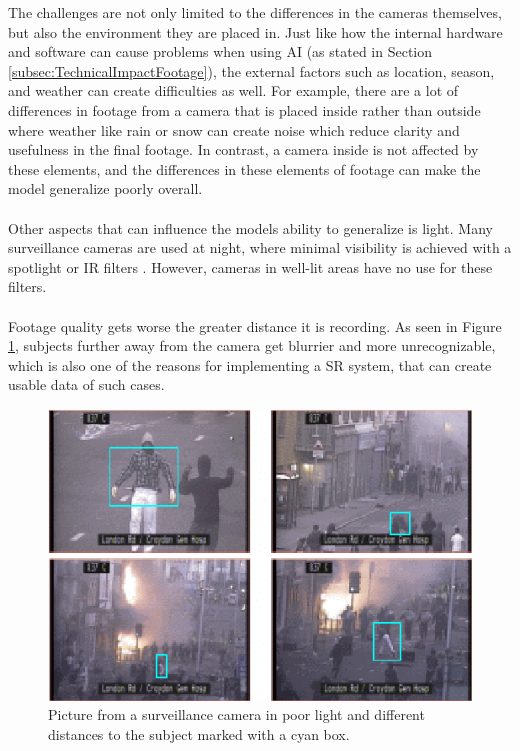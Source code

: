 The challenges are not only limited to the differences in the cameras themselves, but also the environment they are placed in. Just like how the internal hardware and software can cause problems when using \acs{AI} (as stated in Section \ref{subsec:TechnicalImpactFootage}), the external factors such as location, season, and weather can create difficulties as well. For example, there are a lot of differences in footage from a camera that is placed inside rather than outside where weather like rain or snow can create noise which reduce clarity and usefulness in the final footage. In contrast, a camera inside is not affected by these elements, and the differences in these elements of footage can make the model generalize poorly overall\cite{arxiv_superres2021}. 
\\\\
Other aspects that can influence the models ability to generalize is light. Many surveillance cameras are used at night, where minimal visibility is achieved with a spotlight or \acf{IR} filters \cite{nightvision_enhancement2018}. However, cameras in well-lit areas have no use for these filters.
\\\\
Footage quality gets worse the greater distance it is recording. As seen in Figure \ref{fig:camera_distance}, subjects further away from the camera get blurrier and more unrecognizable, which is also one of the reasons for implementing a \acs{SR} system, that can create usable data of such cases. 
\begin{figure}[H]
    \centering
    \includegraphics[width=0.7\linewidth]{figures/images/Typical-images-from-a-single-CCTV-camera-with-poor-lighting-and-long-range-camera-views.png}
    \caption{Picture from a surveillance camera in poor light and different distances to the subject marked with a cyan box.}
    \label{fig:camera_distance}
\end{figure}


